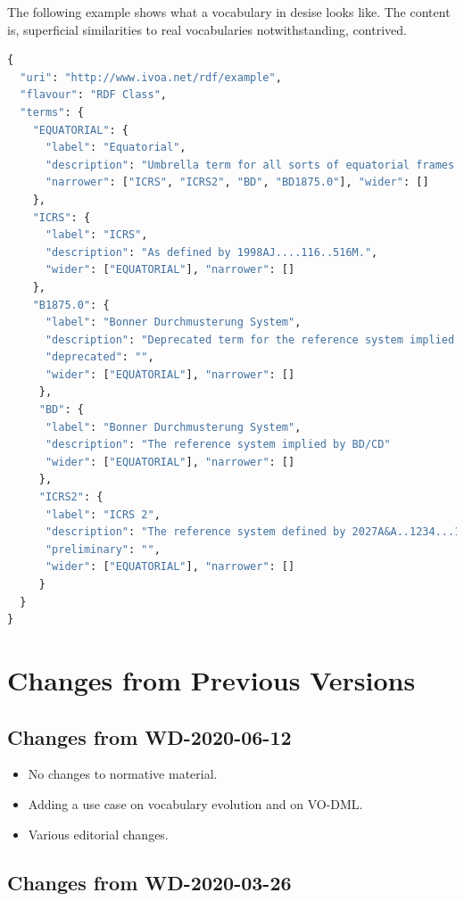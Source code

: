 \documentclass[11pt,a4paper]{ivoa}
\begin{document}
The following example shows what a vocabulary in desise looks like.  The
content is, superficial similarities to real vocabularies
notwithstanding, contrived.

\begin{lstlisting}[language=python]
{
  "uri": "http://www.ivoa.net/rdf/example",
  "flavour": "RDF Class",
  "terms": {
    "EQUATORIAL": {
      "label": "Equatorial",
      "description": "Umbrella term for all sorts of equatorial frames.",
      "narrower": ["ICRS", "ICRS2", "BD", "BD1875.0"], "wider": []
    },
    "ICRS": {
      "label": "ICRS",
      "description": "As defined by 1998AJ....116..516M.",
      "wider": ["EQUATORIAL"], "narrower": []
    },
    "B1875.0": {
      "label": "Bonner Durchmusterung System",
      "description": "Deprecated term for the reference system implied by BD/CD",
      "deprecated": "",
      "wider": ["EQUATORIAL"], "narrower": []
     },
     "BD": {
      "label": "Bonner Durchmusterung System",
      "description": "The reference system implied by BD/CD"
      "wider": ["EQUATORIAL"], "narrower": []
     },
     "ICRS2": {
      "label": "ICRS 2",
      "description": "The reference system defined by 2027A&A..1234...12B",
      "preliminary": "",
      "wider": ["EQUATORIAL"], "narrower": []
     }
  }
}
\end{lstlisting}

\section{Changes from Previous Versions}

\subsection{Changes from WD-2020-06-12}

\begin{itemize}
\item No changes to normative material.
\item Adding a use case on vocabulary evolution and on VO-DML.
\item Various editorial changes.
\end{itemize}

\subsection{Changes from WD-2020-03-26}
\end{document}
